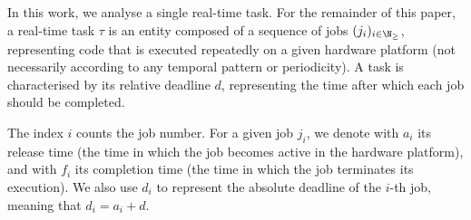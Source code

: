 In this work, we analyse a single real-time task. 
For the remainder of this paper, a real-time task $\tau$ is an entity composed of a sequence of jobs $(j_i)_{i \in \N_{\geq}}$, representing code that is executed repeatedly on a given hardware platform (not necessarily according to any temporal pattern or periodicity). 
A task is characterised by its relative deadline $d$, representing the time after which each job should be completed.

The index $i$ counts the job number. 
For a given job $j_i$, we denote with $a_i$ its release time (the time in which the job becomes active in the hardware platform), and with $f_i$ its completion time (the time in which the job terminates its execution). 
We also use $d_i$ to represent the absolute deadline of the $i$-th job, meaning that $d_i=a_i+d$.

